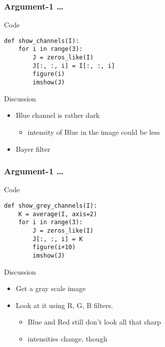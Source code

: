 \documentclass[presentation]{beamer}
\begin{document}
\begin{frame}[fragile]
\frametitle{Argument-1 \ldots{}}
\label{sec-2_5}
\begin{block}{Code}
\label{sec-2_5_1}

\lstset{language=Python}
\begin{lstlisting}
def show_channels(I):
    for i in range(3):
        J = zeros_like(I)
        J[:, :, i] = I[:, :, i]
        figure(i)
        imshow(J)
\end{lstlisting}
\end{block}
\begin{block}{Discussion}
\label{sec-2_5_2}
\begin{itemize}

\item Blue channel is rather dark
\label{sec-2_5_2_1}%
\begin{itemize}

\item intensity of Blue in the image could be less\\
\label{sec-2_5_2_1_1}%
\end{itemize} %

\item Bayer filter\\
\label{sec-2_5_2_2}%
\end{itemize} %
\end{block}
\end{frame}
\begin{frame}[fragile]
\frametitle{Argument-1 \ldots{}}
\label{sec-2_6}
\begin{block}{Code}
\label{sec-2_6_1}

\lstset{language=Python}
\begin{lstlisting}
def show_grey_channels(I):
    K = average(I, axis=2)
    for i in range(3):
        J = zeros_like(I)
        J[:, :, i] = K
        figure(i+10)
        imshow(J)
\end{lstlisting}
      
\end{block}
\begin{block}{Discussion}
\label{sec-2_6_2}
\begin{itemize}

\item Get a gray scale image\\
\label{sec-2_6_2_1}%
\item Look at it using R, G, B filters.
\label{sec-2_6_2_2}%
\begin{itemize}

\item Blue and Red still don't look all that sharp\\
\label{sec-2_6_2_2_1}%
\item intensities change, though\\
\label{sec-2_6_2_2_2}%
\end{itemize} %
\end{itemize} %
\end{block}
\end{frame}
\end{document}
